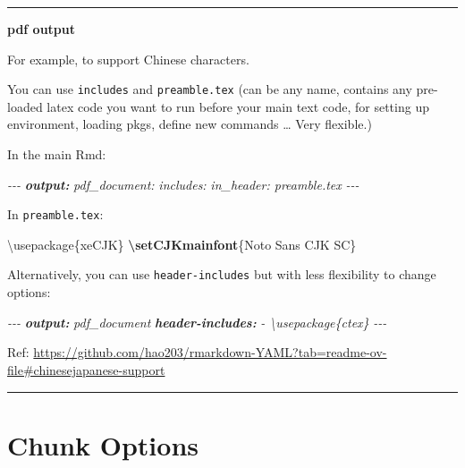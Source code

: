 \documentclass[
]{book}
\newenvironment{Shaded}{\begin{snugshade}}{\end{snugshade}}
\newcommand{\AnnotationTok}[1]{\textcolor[rgb]{0.56,0.35,0.01}{\textbf{\textit{#1}}}}
\newcommand{\BuiltInTok}[1]{#1}
\newcommand{\CommentTok}[1]{\textcolor[rgb]{0.56,0.35,0.01}{\textit{#1}}}
\newcommand{\ExtensionTok}[1]{#1}
\newcommand{\FunctionTok}[1]{\textcolor[rgb]{0.13,0.29,0.53}{\textbf{#1}}}
\newcommand{\NormalTok}[1]{#1}
\theoremstyle{definition}
\theoremstyle{definition}
\theoremstyle{definition}
\theoremstyle{definition}
\theoremstyle{remark}
\begin{document}
\begin{center}\rule{0.5\linewidth}{0.5pt}\end{center}

\textbf{pdf output}

For example, to support Chinese characters.

You can use \texttt{includes} and \texttt{preamble.tex} (can be any name, contains any pre-loaded latex code you want to run before your main text code, for setting up environment, loading pkgs, define new commands \ldots{} Very flexible.)

In the main Rmd:

\begin{Shaded}
\begin{Highlighting}[]
\CommentTok{{-}{-}{-}}
\AnnotationTok{output:}
\CommentTok{  pdf\_document:}
\CommentTok{    includes:}
\CommentTok{      in\_header: preamble.tex}
\CommentTok{{-}{-}{-}}
\end{Highlighting}
\end{Shaded}

In \texttt{preamble.tex}:

\begin{Shaded}
\begin{Highlighting}[]
\BuiltInTok{\textbackslash{}usepackage}\NormalTok{\{}\ExtensionTok{xeCJK}\NormalTok{\}  }
\FunctionTok{\textbackslash{}setCJKmainfont}\NormalTok{\{Noto Sans CJK SC\}}
\end{Highlighting}
\end{Shaded}

Alternatively, you can use \texttt{header-includes} but with less flexibility to change options:

\begin{Shaded}
\begin{Highlighting}[]
\CommentTok{{-}{-}{-}}
\AnnotationTok{output:}\CommentTok{ pdf\_document}
\AnnotationTok{header{-}includes:}
\CommentTok{  {-} \textbackslash{}usepackage\{ctex\}}
\CommentTok{{-}{-}{-}}
\end{Highlighting}
\end{Shaded}

Ref: \url{https://github.com/hao203/rmarkdown-YAML?tab=readme-ov-file\#chinesejapanese-support}

\begin{center}\rule{0.5\linewidth}{0.5pt}\end{center}

\section{Chunk Options}\label{chunk-options}
\end{document}
